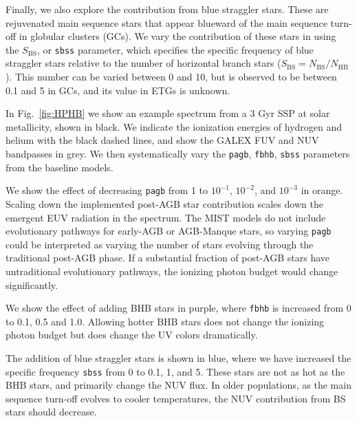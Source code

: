 Finally, we also explore the contribution from blue straggler stars. These are rejuvenated main sequence stars that appear blueward of the main sequence turn-off in globular clusters (GCs). We vary the contribution of these stars in \FSPS using the $S_{\mathrm{BS}}$, or {\tt sbss} parameter, which specifies the specific frequency of blue straggler stars relative to the number of horizontal branch stars ($S_{\mathrm{BS}} = N_{\mathrm{BS}} / N_{\mathrm{HB}}$). This number can be varied between 0 and 10, but is observed to be between 0.1 and 5 in GCs, and its value in ETGs is unknown.

In Fig.~\ref{fig:HPHB} we show an example spectrum from a 3 Gyr SSP at solar metallicity, shown in black. We indicate the ionization energies of hydrogen and helium with the black dashed lines, and show the GALEX FUV and NUV bandpasses in grey. We then systematically vary the {\tt pagb}, {\tt fbhb}, {\tt sbss} parameters from the baseline models.

We show the effect of decreasing {\tt pagb} from 1 to $10^{-1}$, $10^{-2}$, and $10^{-3}$ in orange. Scaling down the implemented post-AGB star contribution scales down the emergent EUV radiation in the spectrum. The MIST models do not include evolutionary pathways for early-AGB or AGB-Manque stars, so varying {\tt pagb} could be interpreted as varying the number of stars evolving through the traditional post-AGB phase. If a substantial fraction of post-AGB stars have untraditional evolutionary pathways, the ionizing photon budget would change significantly.

We show the effect of adding BHB stars in purple, where {\tt fbhb} is increased from 0 to 0.1, 0.5 and 1.0. Allowing hotter BHB stars does not change the ionizing photon budget but does change the UV colors dramatically. 

The addition of blue straggler stars is shown in blue, where we have increased the specific frequency {\tt sbss} from 0 to 0.1, 1, and 5. These stars are not as hot as the BHB stars, and primarily change the NUV flux. In older populations, as the main sequence turn-off evolves to cooler temperatures, the NUV contribution from BS stars should decrease.


